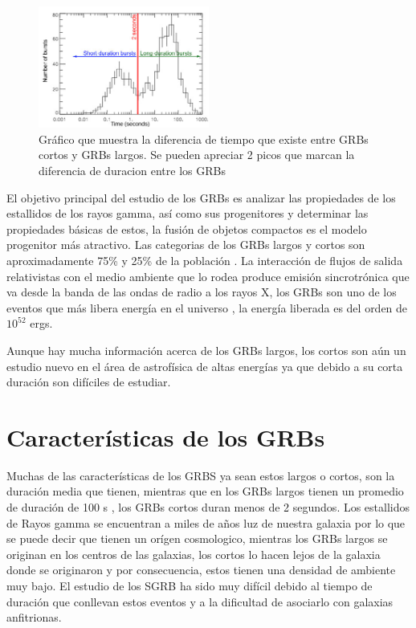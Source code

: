 \documentclass[12pt,a4paper]{book}
\begin{document}
\begin{figure} 
  \centering
    \includegraphics[width=0.5\textwidth]{Figuras/burst_durations_labelled.jpg}
  \caption{Gráfico que muestra la diferencia de tiempo que existe entre GRBs cortos y GRBs largos. Se pueden apreciar 2 picos que marcan la diferencia de duracion entre los GRBs}
  \label{fig:Batse_duration_GRBs}
\end{figure}

El objetivo principal del estudio de los GRBs es analizar las propiedades de los estallidos de los rayos gamma, así como sus progenitores y determinar las propiedades básicas de estos, la fusión de objetos compactos es el modelo progenitor más atractivo.
Las categorias de los GRBs largos y cortos son aproximadamente 75\% y 25\% de la población \cite{GRB:PPP}. %
La interacción de flujos de salida relativistas con el medio ambiente que lo rodea produce emisión sincrotrónica que va desde la banda de las ondas de radio a los rayos X, los GRBs son uno de los eventos que más libera energía en el universo \cite{Berger:2013jza}, la energía liberada es del orden de $10^{52}$ ergs.

Aunque hay mucha información acerca de los GRBs largos, los cortos son aún un estudio nuevo en el área de astrofísica de altas energías ya que debido a su corta duración son difíciles de estudiar. 
\section{Características de los GRBs}
Muchas de las características de los GRBS ya sean estos largos o cortos, son la duración media que tienen, mientras que en los GRBs largos tienen un promedio de duración de 100 s \cite{PGRB-piran}, los GRBs cortos duran menos de 2 segundos. Los estallidos de Rayos gamma se encuentran a miles de años luz de nuestra galaxia por lo que se puede decir que tienen un orígen cosmologico, mientras los GRBs largos se originan en los centros de las galaxias, los cortos lo hacen lejos de la galaxia donde se originaron y por consecuencia, estos tienen una densidad de ambiente muy bajo. El estudio de los SGRB ha sido muy difícil debido al tiempo de duración que conllevan estos eventos y a la dificultad de asociarlo con galaxias anfitrionas. 
\end{document}

